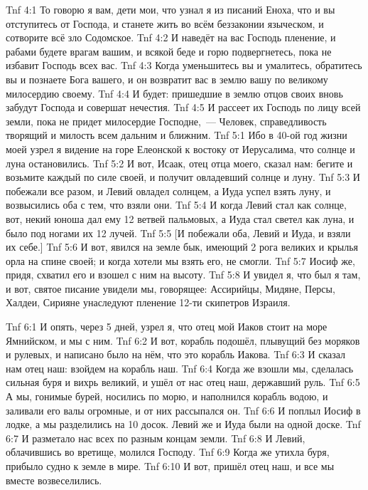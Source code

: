 \vs Tnf 4:1
То говорю я вам, дети мои, что узнал я из писаний Еноха,
что и вы отступитесь от Господа,
и станете жить во всём беззаконии языческом,
и сотворите всё зло Содомское.
\vs Tnf 4:2
И наведёт на вас Господь пленение,
и рабами будете врагам вашим,
и всякой беде и горю подвергнетесь,
пока не избавит Господь всех вас.
\vs Tnf 4:3
Когда уменьшитесь вы и умалитесь,
обратитесь вы и познаете Бога вашего,
и он возвратит вас в землю вашу по великому милосердию своему.
\vs Tnf 4:4
И будет: пришедшие в землю отцов своих вновь забудут Господа
и совершат нечестия.
\vs Tnf 4:5
И рассеет их Господь по лицу всей земли,
пока не придет милосердие Господне,~--- Человек,
справедливость творящий и милость всем дальним и ближним.
\vs Tnf 5:1
Ибо в 40-ой год жизни моей узрел я видение
на горе Елеонской к востоку от Иерусалима,
что солнце и луна остановились.
\vs Tnf 5:2
И вот, Исаак, отец отца моего, сказал нам:
бегите и возьмите каждый по силе своей,
и получит овладевший солнце и луну.
\vs Tnf 5:3
И побежали все разом, и Левий овладел солнцем,
а Иуда успел взять луну,
и возвысились оба с тем, что взяли они.
\vs Tnf 5:4
И когда Левий стал как солнце, вот,
некий юноша дал ему 12 ветвей пальмовых,
а Иуда стал светел как луна,
и было под ногами их 12 лучей.
\vs Tnf 5:5
[И побежали оба, Левий и Иуда, и взяли их себе.]
\vs Tnf 5:6
И вот, явился на земле бык, имеющий 2 рога великих
и крылья орла на спине своей;
и когда хотели мы взять его, не смогли.
\vs Tnf 5:7
Иосиф же, придя, схватил его и взошел с ним на высоту.
\vs Tnf 5:8
И увидел я, что был я там,
и вот, святое писание увидели мы,
говорящее:
Ассирийцы, Мидяне, Персы, Халдеи, Сирияне
унаследуют пленение 12-ти скипетров Израиля.

\vs Tnf 6:1
И опять, через 5 дней, узрел я,
что отец мой Иаков стоит на море Ямнийском, и мы с ним.
\vs Tnf 6:2
И вот, корабль подошёл, плывущий без моряков и рулевых,
и написано было на нём, что это корабль Иакова.
\vs Tnf 6:3
И сказал нам отец наш: взойдем на корабль наш.
\vs Tnf 6:4
Когда же взошли мы, сделалась сильная буря и вихрь великий,
и ушёл от нас отец наш, державший руль.
\vs Tnf 6:5
А мы, гонимые бурей, носились по морю,
и наполнился корабль водою, и заливали его валы огромные,
и от них рассыпался он.
\vs Tnf 6:6
И поплыл Иосиф в лодке, а мы разделились на 10 досок.
Левий же и Иуда были на одной доске.
\vs Tnf 6:7
И разметало нас всех по разным концам земли.
\vs Tnf 6:8
И Левий, облачившись во вретище, молился Господу.
\vs Tnf 6:9
Когда же утихла буря, прибыло судно к земле в мире.
\vs Tnf 6:10
И вот, пришёл отец наш, и все мы вместе возвеселились.

